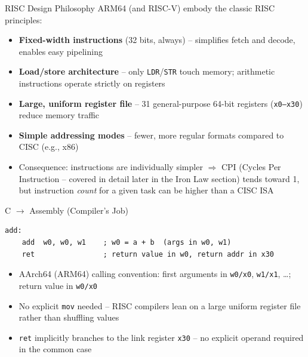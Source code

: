 \documentclass[10pt, aspectratio=169]{beamer}
\begin{document}
\begin{frame}{RISC Design Philosophy}
ARM64 (and RISC-V) embody the classic RISC principles:
\begin{itemize}
    \item \textbf{Fixed-width instructions} (32 bits, always) -- simplifies fetch and decode, enables easy pipelining
    \item \textbf{Load/store architecture} -- only \texttt{LDR}/\texttt{STR} touch memory; arithmetic instructions operate strictly on registers
    \item \textbf{Large, uniform register file} -- 31 general-purpose 64-bit registers (\texttt{x0--x30}) reduce memory traffic
    \item \textbf{Simple addressing modes} -- fewer, more regular formats compared to CISC (e.g., x86)
    \item Consequence: instructions are individually simpler $\Rightarrow$ CPI (Cycles Per Instruction -- covered in detail later in the Iron Law section) tends toward 1, but instruction \emph{count} for a given task can be higher than a CISC ISA
\end{itemize}
\end{frame}

\begin{frame}[fragile]{C $\rightarrow$ Assembly (Compiler's Job)}
\begin{lstlisting}
add:
    add  w0, w0, w1    ; w0 = a + b  (args in w0, w1)
    ret                ; return value in w0, return addr in x30
\end{lstlisting}
\begin{itemize}
    \item AArch64 (ARM64) calling convention: first arguments in \texttt{w0/x0}, \texttt{w1/x1}, \dots; return value in \texttt{w0/x0}
    \item No explicit \texttt{mov} needed -- RISC compilers lean on a large uniform register file rather than shuffling values
    \item \texttt{ret} implicitly branches to the link register \texttt{x30} -- no explicit operand required in the common case
\end{itemize}
\end{frame}
\end{document}
